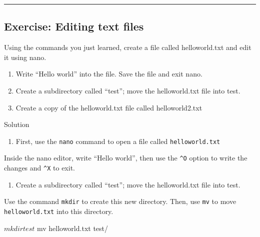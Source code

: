 \documentclass[
]{book}
\newenvironment{Shaded}{\begin{snugshade}}{\end{snugshade}}
\newcommand{\ExtensionTok}[1]{#1}
\newcommand{\NormalTok}[1]{#1}
\providecommand{\tightlist}{%
  \setlength{\itemsep}{0pt}\setlength{\parskip}{0pt}}
\begin{document}
\begin{center}\rule{0.5\linewidth}{0.5pt}\end{center}

\subsection{Exercise: Editing text files}\label{exercise-editing-text-files}

Using the commands you just learned, create a file called helloworld.txt and edit it using nano.

\begin{enumerate}
\def\labelenumi{\arabic{enumi}.}
\tightlist
\item
  Write ``Hello world'' into the file. Save the file and exit nano.
\item
  Create a subdirectory called ``test''; move the helloworld.txt file into test.
\item
  Create a copy of the helloworld.txt file called helloworld2.txt
\end{enumerate}

Solution

\begin{enumerate}
\def\labelenumi{\arabic{enumi}.}
\tightlist
\item
  First, use the \texttt{nano} command to open a file called \texttt{helloworld.txt}
\end{enumerate}

\begin{Shaded}
\end{Shaded}

Inside the nano editor, write ``Hello world'', then use the \texttt{\^{}O} option to write the changes and \texttt{\^{}X} to exit.

\begin{enumerate}
\def\labelenumi{\arabic{enumi}.}
\setcounter{enumi}{1}
\tightlist
\item
  Create a subdirectory called ``test''; move the helloworld.txt file into test.
\end{enumerate}

Use the command \texttt{mkdir} to create this new directory. Then, use \texttt{mv} to move \texttt{helloworld.txt} into this directory.

\begin{Shaded}
\begin{Highlighting}[]
\ExtensionTok{$}\NormalTok{ mkdir test}
\ExtensionTok{$}\NormalTok{ mv helloworld.txt test/}
\end{Highlighting}
\end{Shaded}
\end{document}
